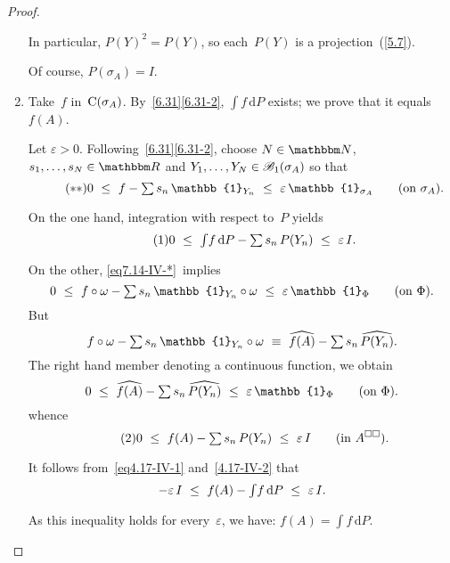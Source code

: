 \documentclass[main.tex]{subfiles}
\begin{document}
\begin{proof}
\begin{enumerate}[label=(\Roman*)]
In particular,
$P(Y)^2=P(Y)$,
so each~$P(Y)$ is a projection~(\ref{5.7}).

Of course, $P(\sigma_A)=I$.
%
\item\label{7.14-IV}
Take~$f$ in~$\mathrm{C}(\sigma_{A})$.
By~\ref{6.31}\ref{6.31-2},
$\int f\,\mathrm{d}P$ exists;
we prove that it equals~$f(A)$.

Let $\varepsilon>0$.
Following~\ref{6.31}\ref{6.31-2},
choose $N\in\N$,
$s_1,\dotsc,s_N\in\R$
and $Y_1,\dotsc,Y_N\in\mathscr{B}_1(\sigma_{A})$ so that
\begin{equation}
\label{eq7.14-IV-*}\tag{$**$}
0\ \leq\ f-{\textstyle\sum}\,s_n\,\mathbb{1}_{Y_n}
\ \leq\ \varepsilon\,\mathbb{1}_{\Sp{A}}\qquad(\htam{on }\Sp{A})\htam{.}
\end{equation}

On the one hand,
integration with respect to~$P$ yields
\begin{equation}
\label{eq7.14-IV-1}\tag{$1$}
0\ \leq\ {\textstyle\int}f\,\mathrm{d}P - 
{\textstyle\sum}\,s_n\,P(Y_n)\ \leq\ \varepsilon\,I\text{.}
\end{equation}

On the other,
\eqref{eq7.14-IV-*}~implies
\begin{equation*}
0\ \leq\ f\circ\omega -{\textstyle\sum}\,s_n\,\mathbb{1}_{Y_n}\circ\omega
\ \leq\ \varepsilon\,\mathbb{1}_\Phi\qquad(\htam{on }\Phi)\htam{.}
\end{equation*}
But
\begin{equation*}
f\circ\omega - {\textstyle\sum}\,s_n\,\mathbb{1}_{Y_n}\circ\omega
\ \equiv\ \widehat{f(A)} - {\textstyle\sum}\,s_n\,\widehat{P(Y_n)}\htam{.}
\end{equation*}
The right hand member denoting a continuous function,
we obtain
\begin{equation*}
0\ \leq\ \widehat{f(A)} - {\textstyle\sum}\,s_n\,\widehat{P(Y_n)}
\ \leq\ \varepsilon\,\mathbb{1}_\Phi\qquad(\htam{on }\Phi)\htam{.}
\end{equation*}
whence
\begin{equation}
\label{eq7.14-IV-2}\tag{$2$}
0\ \leq\ f(A)-{\textstyle\sum}\,s_n\,P(Y_n)\ \leq\ \varepsilon\,I
\qquad(\text{in }A^{\square\square})\text{.}
\end{equation}

It follows from~\eqref{eq4.17-IV-1} and~\eqref{4.17-IV-2} that
\begin{equation*}
-\varepsilon\,I\ \leq\ f(A)-{\textstyle\int}f\,\mathrm{d}P
\ \leq\ \varepsilon\,I\htam{.}
\end{equation*}

As this inequality holds for every~$\varepsilon$,
we have: $f(A)=\int f\,\mathrm{d}P$. \xqed
\end{enumerate}
\end{proof}
%
%
%
\clearpage
\end{document}
